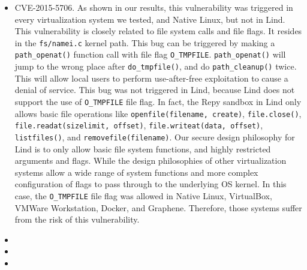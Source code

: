 \begin{itemize}
\item CVE-2015-5706. As shown in our results, this vulnerability was triggered in every 
virtualization system we tested, and Native Linux, but not in Lind. This vulnerability 
is closely related to file system calls and file flags. It resides in the \texttt{fs/namei.c} 
kernel path. This bug can be triggered by making a \texttt{path\_openat()} function 
call with file flag \texttt{O\_TMPFILE}. \texttt{path\_openat()} will jump to the wrong 
place after \texttt{do\_tmpfile()}, and do \texttt{path\_cleanup()} twice. This will 
allow local users to perform use-after-free exploitation to cause a denial of service. 
This bug was not triggered in Lind, because Lind does not support the use of 
\texttt{O\_TMPFILE} file flag. In fact, the Repy sandbox in Lind only allows 
basic file operations like 
\texttt{openfile(filename, create)}, \texttt{file.close()}, \texttt{file.readat(sizelimit, offset)}, 
\texttt{file.writeat(data, offset)}, \texttt{listfiles()}, and \texttt{removefile(filename)}.  
Our secure design philosophy for Lind is to only allow basic file system functions, 
and highly restricted arguments and flags. While the design philosophies of other virtualization 
systems allow a wide range of system functions and more complex configuration of flags to 
pass through to the underlying OS kernel. In this case, the \texttt{O\_TMPFILE} file flag was 
allowed in Native Linux, VirtualBox, VMWare Workstation, Docker, and Graphene. Therefore, 
those systems suffer from the risk of this vulnerability.

\item

\item

\item

\end{itemize}

